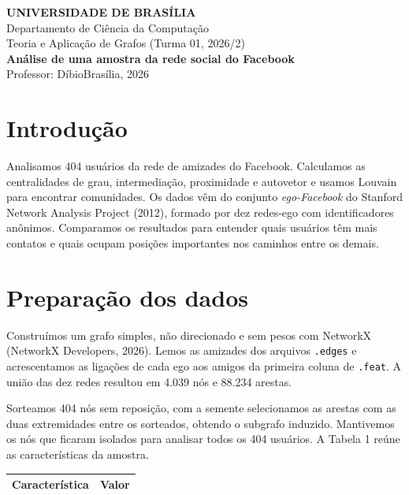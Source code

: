 \documentclass[12pt,a4paper]{article}
\newcommand{\fonte}{\par\noindent{\fontsize{10}{12}\selectfont Fonte: elaboração própria (2026).}\par}
\begin{document}
\begin{center}
\begin{singlespace}
\textbf{UNIVERSIDADE DE BRASÍLIA}\\
Departamento de Ciência da Computação\\
Teoria e Aplicação de Grafos (Turma 01, 2026/2)\\[0.4cm]
\textbf{Análise de uma amostra da rede social do Facebook}\\[0.3cm]
Professor: Díbio\qquad Brasília, 2026
\end{singlespace}
\end{center}

\section{Introdução}
Analisamos 404 usuários da rede de amizades do Facebook. Calculamos as
centralidades de grau, intermediação, proximidade e autovetor e usamos Louvain
para encontrar comunidades. Os dados vêm do conjunto \textit{ego-Facebook}
do Stanford Network Analysis Project (2012), formado por dez redes-ego com
identificadores anônimos. Comparamos os resultados para entender quais
usuários têm mais contatos e quais ocupam posições importantes nos caminhos
entre os demais.

\section{Preparação dos dados}
Construímos um grafo simples, não direcionado e sem pesos com NetworkX
(NetworkX Developers, 2026). Lemos as amizades dos arquivos \texttt{.edges}
e acrescentamos as ligações de cada ego aos amigos da primeira coluna de
\texttt{.feat}. A união das dez redes resultou em 4.039 nós e 88.234 arestas.

Sorteamos 404 nós sem reposição, com a semente %
selecionamos as arestas com as duas extremidades entre os sorteados,
obtendo o subgrafo induzido. Mantivemos os nós que ficaram isolados para
analisar todos os 404 usuários. A Tabela 1 reúne as características da amostra.

\begin{singlespace}
\begin{center}
\fontsize{10}{12}\selectfont
\begin{tabular*}{\textwidth}{@{\extracolsep{\fill}}lr}
\toprule
\textbf{Característica} & \textbf{Valor}\\
\midrule
\bottomrule
\end{tabular*}
\end{center}
\fonte
\end{singlespace}
\end{document}
